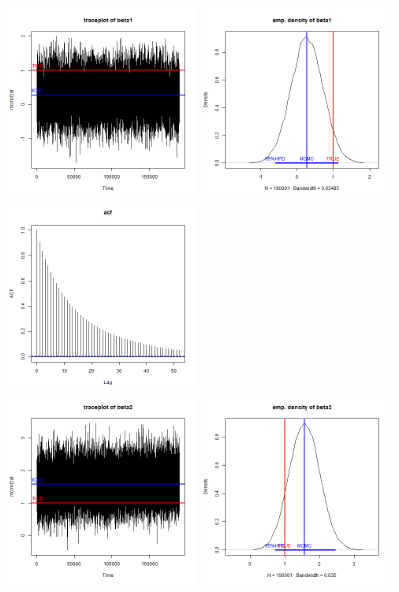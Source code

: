 \documentclass{article}
\begin{document}
\begin{figure}[h]
    \centering
    \includegraphics[width=5cm]{prob3_beta1_traceplot.png} 
    \includegraphics[width=5cm]{prob3_beta1_density.png} 
    \includegraphics[width=5cm]{prob3_beta1_acf.png} \\
    \includegraphics[width=5cm]{prob3_beta2_traceplot.png} 
    \includegraphics[width=5cm]{prob3_beta2_density.png} 

\end{figure}
\end{document}
